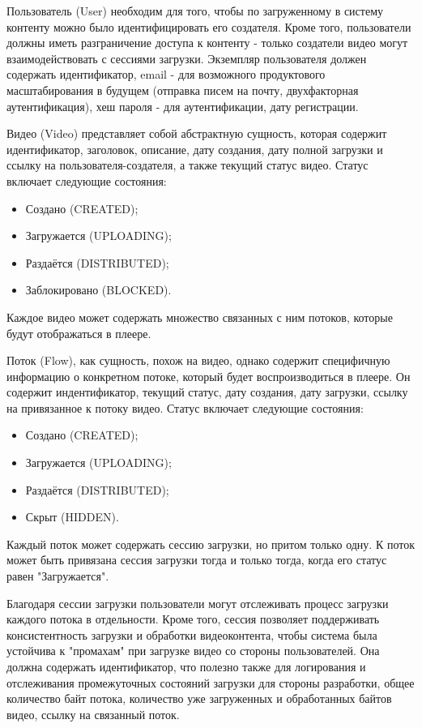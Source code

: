 	Пользователь (User) необходим для того, чтобы по загруженному в систему контенту можно было идентифицировать его создателя. Кроме того, пользователи должны иметь разграничение доступа к контенту - только создатели видео могут взаимодействовать с сессиями загрузки. Экземпляр пользователя должен содержать идентификатор, email - для возможного продуктового масштабирования в будущем (отправка писем на почту, двухфакторная аутентификация), хеш пароля - для аутентификации, дату регистрации.

	Видео (Video) представляет собой абстрактную сущность, которая содержит идентификатор, заголовок, описание, дату создания, дату полной загрузки и ссылку на пользователя-создателя, а также текущий статус видео. Статус включает следующие состояния:
	\begin{itemize}[label=$\bullet$]
		\item Создано (CREATED);
		\item Загружается (UPLOADING);
		\item Раздаётся (DISTRIBUTED);
		\item Заблокировано (BLOCKED).
	\end{itemize}

	Каждое видео может содержать множество связанных с ним потоков, которые будут отображаться в плеере.

	Поток (Flow), как сущность, похож на видео, однако содержит специфичную информацию о конкретном потоке, который будет воспроизводиться в плеере. Он содержит индентификатор, текущий статус, дату создания, дату загрузки, ссылку на привязанное к потоку видео. Статус включает следующие состояния:
	\begin{itemize}[label=$\bullet$]
		\item Создано (CREATED);
		\item Загружается (UPLOADING);
		\item Раздаётся (DISTRIBUTED);
		\item Скрыт (HIDDEN).
	\end{itemize}

	Каждый поток может содержать сессию загрузки, но притом только одну. К поток может быть привязана сессия загрузки тогда и только тогда, когда его статус равен "Загружается".

	Благодаря сессии загрузки пользователи могут отслеживать процесс загрузки каждого потока в отдельности. Кроме того, сессия позволяет поддерживать консистентность загрузки и обработки видеоконтента, чтобы система была устойчива к "промахам" при загрузке видео со стороны пользователей. Она должна содержать идентификатор, что полезно также для логирования и отслеживания промежуточных состояний загрузки для стороны разработки, общее количество байт потока, количество уже загруженных и обработанных байтов видео, ссылку на связанный поток.
	
